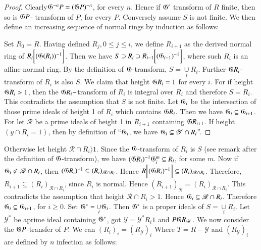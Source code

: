 \begin{proof}
  Clearly\pageoriginale  $\mathfrak{G}^{-n} P = (\mathfrak{G} P)^{-n}$, for 
  every $n$. Hence if $\mathfrak{G}'$ 
  transform  of $R$  finite, then  so  is  $\mathfrak{G} P$-
  transform of $P$, for  every  $P$. Conversely assume  $S$  is not
  finite. We  then define an  increasing sequence of  normal rings  by
  induction as follows: 
 
  Set  $R_{0} = R$. Having  defined  $R_{j},  0 \leq j \leq i$, we define
  $R_{i+1}$ as  the  derived normal ring of $R_i
  \bigg[(\mathfrak{G}(R_i))^{-1} \bigg ]$. Then we have $ S\supset R_i
  \supset R_{i-1} \bigg [(\mathfrak{G}_{i-1})^{-1}\bigg ]$, where such
  $R_i$ is an affine normal ring. By the definition of
  $\mathfrak{G}$-transform, $S=\underset{i}\cup R_i $. Further 
          $\mathfrak{G} R_i$- transform of $R_i$ is also $S$. We claim
          that height $\mathfrak{G} R_i=1$ for every $i$. For if height
          $\mathfrak{G} R_i >  1$, then the $\mathfrak{G}
          R_i-$transform of $R_i$ is integral over $R_i$ and therefore
          $S=R_i$. This contradicts the assumption that $S$ is not
          finite. Let $\mathfrak{G}_i$ be the intersection of those
          prime ideals of height 1 of $R_i$ which contains
          $\mathfrak{G} R_i$. Then we have $\mathfrak{G}_i \subseteq
          \mathfrak{G}_{i+1}$. For let $\mathscr{R}$ be a prime ideals
          of height 1 in $R_{i+1}$ containing
          $\mathfrak{G} R_{i+1}$. If height $(y \cap R_i=1)$, then by definition
          of ``$\mathfrak{G}_i$, we have $\mathfrak{G}_i \subseteq \mathscr{Y} \cap R_i$''.   
\end{proof}

 Otherwise let height $\mathscr{R}\cap R_i  \rangle 1$. Since the
 $\mathfrak{G}$-transform of  $R_i$ is  $S$ (see remark after the
 definition of $\mathfrak{G}$-transform), we have $(\mathfrak{G} R_i)^{-1} \mathfrak{G}_i^{m}
 \subseteq R_i$, for some $m$. Now if 
 $\mathfrak{G}_i \not\subset \mathscr{R} \cap R_i$, then
 $(\mathfrak{G} R_i)^{-1} \subseteq (R_i)_{\mathscr{R}\cap R_i}$. Hence
 $R \bigg [(\mathfrak{G} R_i)^{-1}\bigg ]\subseteq
 (R_i)_{\mathscr{R}\cap R_i}$. Therefore, $R_{i+1}\subseteq
 (R_i)_{\mathscr{R}\cap R_i}$, since $R_i$ is normal. Hence
 $(R_{i+1})_{\mathscr{R}} =(R_i)_{\mathscr{R}\cap R_i}$. This
 contradicts the assumption that height $\mathscr{R} \cap R_i >
 1$. Hence $\mathfrak{G}_i \subseteq \mathscr{R} \cap R_i$. Therefore
 $\mathfrak{G}_i \subseteq \mathfrak{G}_{i+1}$, for $i \ge 0$. Set
 $\mathfrak{G}^*=\underset {i}\cup \mathfrak{G}_i$. Then $\mathfrak{G}^*$
 is a proper ideals of $S=\underset{i}\cup R_i$. Let $\mathscr{Y}^*$
 be a\pageoriginale prime ideal containing $\mathfrak{G}^*$, got
 $\mathscr{Y}=\mathscr{Y}^* R_i 1$  and $P \mathfrak{G}  R_\mathscr{Y}$. We now
 consider the $\mathfrak{G} P$-transfer of 
 $P$. We can $(R_i)_i=(R_\mathscr{Y})_i $ Where $T=R-\mathscr{Y}$ and
 $(R_\mathscr{Y})_i$ are defined by $n$ infection as follows:  
 
